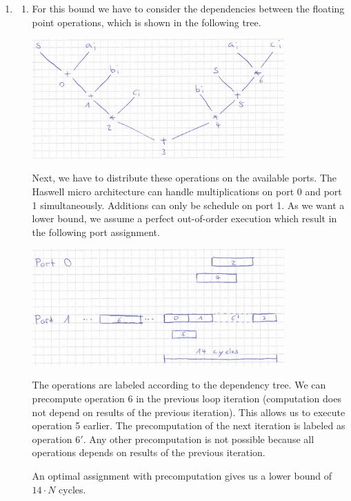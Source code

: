\documentclass[a4paper]{article}
\begin{document}
\begin{enumerate}
    \item 
    \begin{enumerate}
        \item For this bound we have to consider the dependencies between the floating point operations, which is shown in the following tree.
        \begin{center}
        \includegraphics[width=0.8\textwidth]{normal_dep_tree.png}
        \end{center}
        Next, we have to distribute these operations on the available ports. The Haswell micro architecture can handle multiplications on port 0 and port 1 simultaneously. Additions can only be schedule on port 1. As we want a lower bound, we assume a perfect out-of-order execution which result in the following port assignment.
        
        \begin{center}
        \includegraphics[width=0.8\textwidth]{normal_scheduling.png}
        \end{center}
        
        The operations are labeled according to the dependency tree. We can precompute operation 6 in the previous loop iteration (computation does not depend on results of the previous iteration). This allows us to execute operation 5 earlier. The precomputation of the next iteration is labeled as operation $6'$. Any other precomputation is not possible because all operations depends on results of the previous iteration.
        
        An optimal assignment with precomputation gives us a lower bound of $14 \cdot N$ cycles.
        

\end{enumerate}
\end{enumerate}
\end{document}
